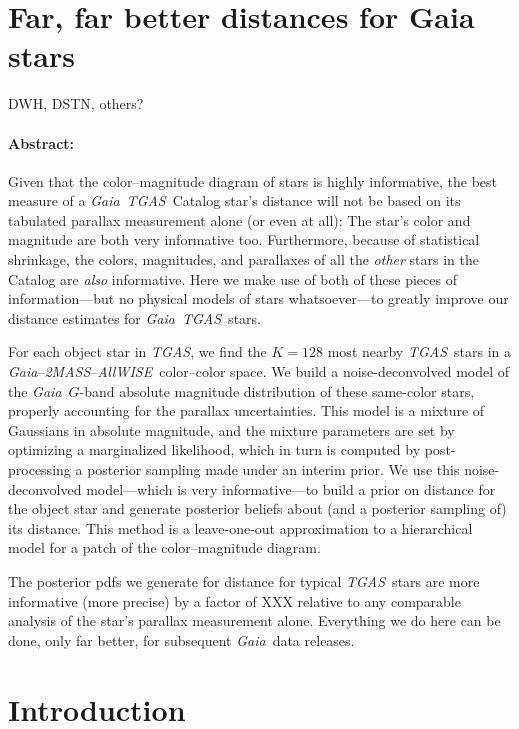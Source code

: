\documentclass[12pt]{article}
\newcommand{\project}[1]{\textsl{#1}}
\newcommand{\acronym}[1]{\small{#1}}
\newcommand{\gaia}{\project{Gaia}}
\newcommand{\tgas}{\project{\acronym{TGAS}}}
\newcommand{\twomass}{\project{\acronym{2MASS}}}
\newcommand{\wise}{\project{All\acronym{WISE}}}
\begin{document}
\section*{Far, far better distances for Gaia stars}

\noindent
DWH, DSTN, others?

\paragraph{Abstract:}
Given that the color--magnitude diagram of stars is highly informative, the
best measure of a \gaia\ \tgas\ Catalog star's distance will not be based on
its tabulated parallax measurement alone (or even at all):
The star's color and magnitude are both very informative too.
Furthermore, because of statistical shrinkage, the colors, magnitudes,
and parallaxes of all the \emph{other} stars in the Catalog are \emph{also}
informative.
Here we make use of both of these pieces of information---but no
physical models of stars whatsoever---to greatly improve our distance
estimates for \gaia\ \tgas\ stars.

For each object star in \tgas, we find the $K=128$ most nearby \tgas\ stars
in a \gaia--\twomass--\wise\ color--color space.
We build a noise-deconvolved model of the \gaia\ $G$-band absolute
magnitude distribution of these same-color stars, properly accounting
for the parallax uncertainties.
This model is a mixture of Gaussians in absolute magnitude, and the
mixture parameters are set by optimizing a marginalized likelihood,
which in turn is computed by post-processing a posterior sampling made
under an interim prior.
We use this noise-deconvolved model---which is very informative---to
build a prior on distance for the object star and generate posterior
beliefs about (and a posterior sampling of) its distance.
This method is a leave-one-out approximation to a hierarchical model for
a patch of the color--magnitude diagram.

The posterior pdfs we generate for distance for typical \tgas\ stars
are more informative (more precise) by a factor of XXX relative to any
comparable analysis of the star's parallax measurement alone.
Everything we do here can be done, only far better, for subsequent
\gaia\ data releases.

\section{Introduction}
\end{document}
